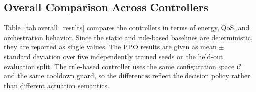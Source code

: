 \documentclass[a4paper,fleqn]{cas-sc}
\begin{document}
\subsection{Overall Comparison Across Controllers}
\label{subsec:overall}

Table~\ref{tab:overall_results} compares the controllers in terms of energy, QoS, and orchestration behavior. Since the static and rule-based baselines are deterministic, they are reported as single values. The PPO results are given as mean $\pm$ standard deviation over five independently trained seeds on the held-out evaluation split. The rule-based controller uses the same configuration space $\mathcal{C}$ and the same cooldown guard, so the differences reflect the decision policy rather than different actuation semantics.

\begin{table}[width=.9\linewidth,cols=7,pos=h]
\centering
\caption{Overall results on the main held-out evaluation split. Lower is better for $E_{\mathrm{tot}}$, $\overline{\mathrm{SEC}}$, and $v$. $n_{\mathrm{sw}}$ counts type-switch events (DPDK$\leftrightarrow$USR); $n_{\mathrm{sc}}$ counts horizontal scaling events (USR instance-count changes); $n_{\mathrm{bl}}$ counts change requests blocked by the cooldown guard. $E_{\mathrm{tot}}$ is in Wh and $\overline{\mathrm{SEC}}$ in Wh/Mbit. PPO rows report mean $\pm$ standard deviation over five seeds.}
\label{tab:overall_results}
\small
{}

\end{table}
\end{document}
